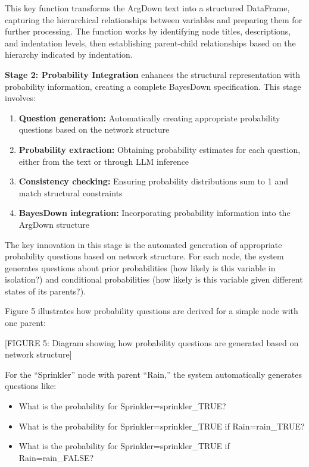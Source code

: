 \documentclass[
  11pt,
  letterpaper,
]{book}
\providecommand{\tightlist}{%
  \setlength{\itemsep}{0pt}\setlength{\parskip}{0pt}}
\begin{document}
This key function transforms the ArgDown text into a structured
DataFrame, capturing the hierarchical relationships between variables
and preparing them for further processing. The function works by
identifying node titles, descriptions, and indentation levels, then
establishing parent-child relationships based on the hierarchy indicated
by indentation.

\textbf{Stage 2: Probability Integration} enhances the structural
representation with probability information, creating a complete
BayesDown specification. This stage involves:

\begin{enumerate}
\def\labelenumi{\arabic{enumi}.}
\item
  \textbf{Question generation:} Automatically creating appropriate
  probability questions based on the network structure
\item
  \textbf{Probability extraction:} Obtaining probability estimates for
  each question, either from the text or through LLM inference
\item
  \textbf{Consistency checking:} Ensuring probability distributions sum
  to 1 and match structural constraints
\item
  \textbf{BayesDown integration:} Incorporating probability information
  into the ArgDown structure
\end{enumerate}

The key innovation in this stage is the automated generation of
appropriate probability questions based on network structure. For each
node, the system generates questions about prior probabilities (how
likely is this variable in isolation?) and conditional probabilities
(how likely is this variable given different states of its parents?).

Figure 5 illustrates how probability questions are derived for a simple
node with one parent:

{[}FIGURE 5: Diagram showing how probability questions are generated
based on network structure{]}

For the ``Sprinkler'' node with parent ``Rain,'' the system
automatically generates questions like:

\begin{itemize}
\tightlist
\item
  What is the probability for Sprinkler=sprinkler\_TRUE?
\item
  What is the probability for Sprinkler=sprinkler\_TRUE if
  Rain=rain\_TRUE?
\item
  What is the probability for Sprinkler=sprinkler\_TRUE if
  Rain=rain\_FALSE?
\end{itemize}
\end{document}
